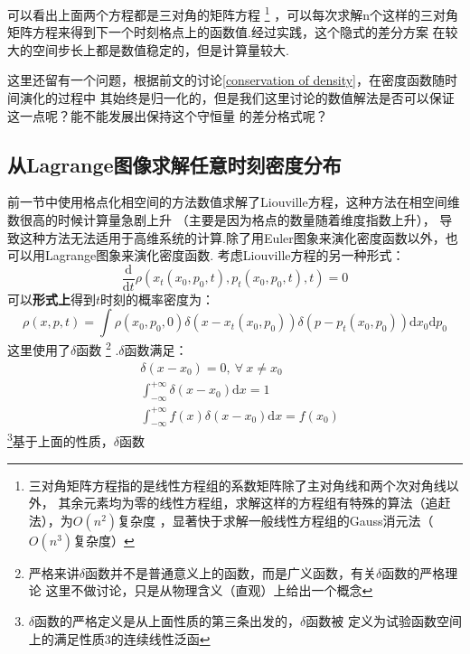     可以看出上面两个方程都是三对角的矩阵方程
    \footnote{
        三对角矩阵方程指的是线性方程组的系数矩阵除了主对角线和两个次对角线以外，
        其余元素均为零的线性方程组，求解这样的方程组有特殊的算法（追赶法），为$O(n^2)$复杂度
        ，显著快于求解一般线性方程组的Gauss消元法（$O(n^3)$复杂度）
    }
    ，可以每次求解n个这样的三对角矩阵方程来得到下一个时刻格点上的函数值.经过实践，这个隐式的差分方案
    在较大的空间步长上都是数值稳定的，但是计算量较大.
    \par 
    这里还留有一个问题，根据前文的讨论\ref{conservation of density}，在密度函数随时间演化的过程中
    其始终是归一化的，但是我们这里讨论的数值解法是否可以保证这一点呢？能不能发展出保持这个守恒量
    的差分格式呢？

    \subsection{从Lagrange图像求解任意时刻密度分布}
    前一节中使用格点化相空间的方法数值求解了Liouville方程，这种方法在相空间维数很高的时候计算量急剧上升
    （主要是因为格点的数量随着维度指数上升），
    导致这种方法无法适用于高维系统的计算.除了用Euler图象来演化密度函数以外，也可以用Lagrange图象来演化密度函数.
    考虑Liouville方程的另一种形式：
    \begin{equation}
        \frac {\mathrm{d}}{\mathrm{d}t} \rho(x_t(x_0, p_0, t),p_t(x_0, p_0, t),t) = 0
    \end{equation}
    可以\textbf{形式上}得到$t$时刻的概率密度为：
    \begin{equation}
        \rho(x,p,t) = \int \rho(x_0,p_0,0)\delta(x-x_t(x_0,p_0)) \delta(p-p_t(x_0,p_0)) \mathrm{d}x_0\mathrm{d}p_0
        \label{formal solution}
    \end{equation}
    这里使用了$\delta$函数
    \footnote{
        严格来讲$\delta$函数并不是普通意义上的函数，而是广义函数，有关$\delta$函数的严格理论
        这里不做讨论，只是从物理含义（直观）上给出一个概念
    }
    .$\delta$函数满足：
    \begin{equation}
        \begin{split}
        &\delta(x-x_0) = 0, \ \forall \ x \neq x_0\\
        &\int_{-\infty}^{+\infty} \delta(x-x_0) \mathrm{d}x = 1\\
        &\int_{-\infty}^{+\infty} f(x)\delta(x-x_0) \mathrm{d}x = f(x_0)
        \end{split}
        \label{delta function}
    \end{equation}
    \footnote{$\delta$函数的严格定义是从上面性质的第三条出发的，$\delta$函数被
    定义为试验函数空间上的满足性质3的连续线性泛函}基于上面的性质，$\delta$函数
